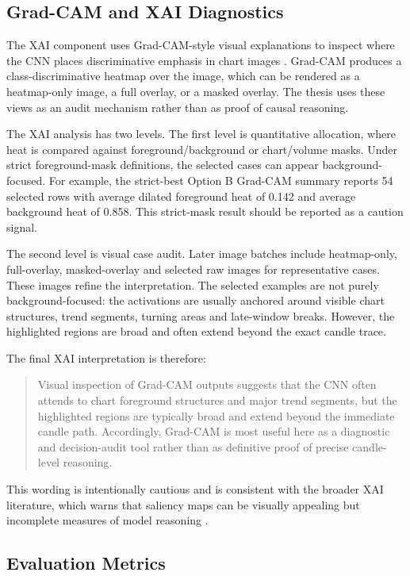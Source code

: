 \subsection{Grad-CAM and XAI Diagnostics}
\label{subsec:gradcam}

The XAI component uses Grad-CAM-style visual explanations to inspect where the CNN places discriminative emphasis in chart images \cite{selvaraju_gradcam}. Grad-CAM produces a class-discriminative heatmap over the image, which can be rendered as a heatmap-only image, a full overlay, or a masked overlay. The thesis uses these views as an audit mechanism rather than as proof of causal reasoning.

The XAI analysis has two levels. The first level is quantitative allocation, where heat is compared against foreground/background or chart/volume masks. Under strict foreground-mask definitions, the selected cases can appear background-focused. For example, the strict-best Option B Grad-CAM summary reports 54 selected rows with average dilated foreground heat of 0.142 and average background heat of 0.858. This strict-mask result should be reported as a caution signal.

The second level is visual case audit. Later image batches include heatmap-only, full-overlay, masked-overlay and selected raw images for representative cases. These images refine the interpretation. The selected examples are not purely background-focused: the activations are usually anchored around visible chart structures, trend segments, turning areas and late-window breaks. However, the highlighted regions are broad and often extend beyond the exact candle trace.

The final XAI interpretation is therefore:
\begin{quote}
Visual inspection of Grad-CAM outputs suggests that the CNN often attends to chart foreground structures and major trend segments, but the highlighted regions are typically broad and extend beyond the immediate candle path. Accordingly, Grad-CAM is most useful here as a diagnostic and decision-audit tool rather than as definitive proof of precise candle-level reasoning.
\end{quote}

This wording is intentionally cautious and is consistent with the broader XAI literature, which warns that saliency maps can be visually appealing but incomplete measures of model reasoning \cite{adebayo_sanity_checks,rudin_black_boxes,arrieta_xai}.

\subsection{Evaluation Metrics}
\label{subsec:evaluation_metrics}

